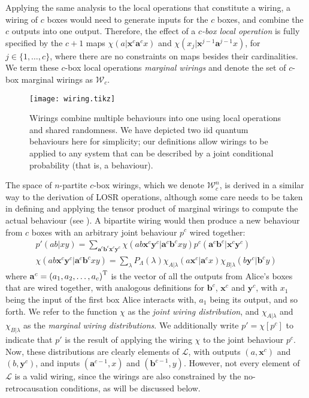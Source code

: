 \documentclass[10pt, a4paper]{article}
\numberwithin{equation}{section} %
\theoremstyle{definition}
\theoremstyle{plain}
\newcommand{\dintv}[2]{\mathopen\{#1,\ldots,#2\mathclose\}}
\newcommand{\?}{\mathrel{?}} %
\newcommand{\cvec}[1]{\boldsymbol{\mathbf{#1}}}    %
\newcommand{\sW}{\mathcal{W}}
\newcommand{\Ls}{\mathcal{L}}
\begin{document}
              Applying the same analysis to the local operations that constitute a wiring, a wiring of \(c\) boxes would need to generate inputs for the \(c\) boxes, and combine the \(c\) outputs into one output. Therefore, the effect of a \emph{\(c\)-box local operation} is fully specified by the \(c+1\) maps \(\chi(a|\cvec{x}^c\cvec{a}^{c}x)\) and \(\chi(x_j|\cvec{x}^{j-1}\cvec{a}^{j-1}x)\), for \(j \in \dintv{1}{c}\), where there are no constraints on maps besides their cardinalities. We term these \(c\)-box local operations \emph{marginal wirings} and denote the set of \(c\)-box marginal wirings as \(\sW_c\).

              \begin{figure}
                \centering
                \texttt{[image: wiring.tikz]}
                \caption[Causal influences in a wiring between two iid quantum behaviours.]{\label{fig:wiring} Wirings combine multiple behaviours into one using local operations and shared randomness. We have depicted two iid quantum behaviours here for simplicity; our definitions allow wirings to be applied to any system that can be described by a joint conditional probability (that is, a behaviour).}
            \end{figure}

              The space of \(n\)-partite \(c\)-box wirings, which we denote \(\sW_c^n\), is derived in a similar way to the derivation of LOSR operations, although some care needs to be taken in defining and applying the tensor product of marginal wirings to compute the actual behaviour (see ). A bipartite wiring would then produce a new behaviour from \(c\) boxes with an arbitrary joint behaviour \(p^c\) wired together:
              \begin{gather}
                p'(ab|xy) = \sum_{\cvec{a}^c\cvec{b}^c\cvec{x}^c\cvec{y}^c} \chi(ab\cvec{x}^c\cvec{y}^c|\cvec{a}^c\cvec{b}^cxy) p^c(\cvec{a}^c\cvec{b}^c|\cvec{x}^c\cvec{y}^c)\label{eqn:jwirdistdef} \\
                \chi(ab\cvec{x}^c\cvec{y}^c|\cvec{a}^c\cvec{b}^cxy) = \sum_{\lambda} P_{\Lambda}(\lambda) \chi_{A|\lambda}(a\cvec{x}^c|\cvec{a}^cx) \chi_{B|\lambda}(b\cvec{y}^c|\cvec{b}^cy) \label{eqn:mwirdistdef}
              \end{gather}
              where \(\cvec{a}^c = {(a_1, a_2, \ldots, a_c)}^{\rm T}\) is the vector of all the outputs from Alice's boxes that are wired together, with analogous definitions for \(\cvec{b}^c\), \(\cvec{x}^c\) and \(\cvec{y}^c\), with \(x_1\) being the input of the first box Alice interacts with, \(a_1\) being its output, and so forth. We refer to the function \(\chi\) as the \emph{joint wiring distribution}, and \(\chi_{A|\lambda}\) and \(\chi_{B|\lambda}\) as the \emph{marginal wiring distributions}. We additionally write \(p' = \chi[p^c]\) to indicate that \(p'\) is the result of applying the wiring \(\chi\) to the joint behaviour \(p^c\). Now, these distributions are clearly elements of \(\Ls\), with outputs \((a, \cvec{x}^c)\) and \((b, \cvec{y}^c)\), and inputs \((\cvec{a}^{c-1}, x)\) and \((\cvec{b}^{c-1}, y)\). However, not every element of \(\Ls\) is a valid wiring, since the wirings are also constrained by the no-retrocausation conditions, as will be discussed below.
\end{document}
